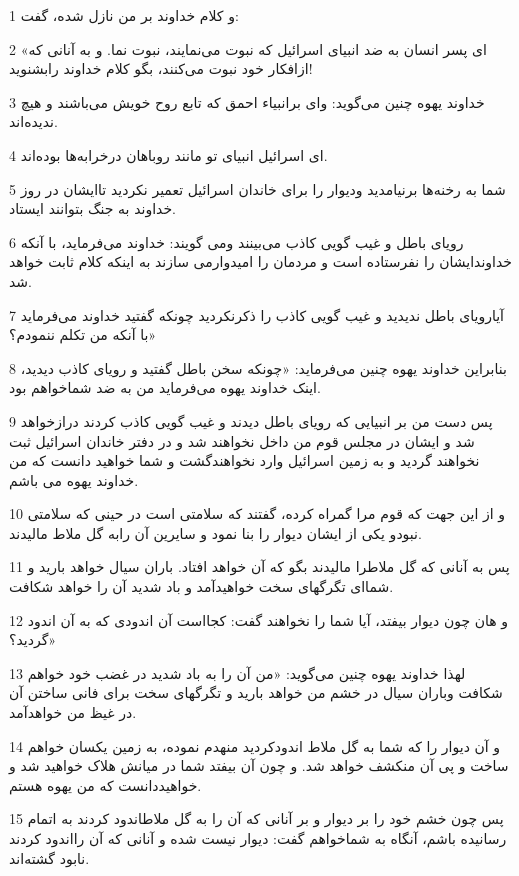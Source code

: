 \par 1 و کلام خداوند بر من نازل شده، گفت:
\par 2 «ای پسر انسان به ضد انبیای اسرائیل که نبوت می‌نمایند، نبوت نما. و به آنانی که ازافکار خود نبوت می‌کنند، بگو کلام خداوند رابشنوید!
\par 3 خداوند یهوه چنین می‌گوید: وای برانبیاء احمق که تابع روح خویش می‌باشند و هیچ ندیده‌اند.
\par 4 ‌ای اسرائیل انبیای تو مانند روباهان درخرابه‌ها بوده‌اند.
\par 5 شما به رخنه‌ها برنیامدید ودیوار را برای خاندان اسرائیل تعمیر نکردید تاایشان در روز خداوند به جنگ بتوانند ایستاد.
\par 6 رویای باطل و غیب گویی کاذب می‌بینند ومی گویند: خداوند می‌فرماید، با آنکه خداوندایشان را نفرستاده است و مردمان را امیدوارمی سازند به اینکه کلام ثابت خواهد شد.
\par 7 آیارویای باطل ندیدید و غیب گویی کاذب را ذکرنکردید چونکه گفتید خداوند می‌فرماید با آنکه من تکلم ننمودم؟»
\par 8 بنابراین خداوند یهوه چنین می‌فرماید: «چونکه سخن باطل گفتید و رویای کاذب دیدید، اینک خداوند یهوه می‌فرماید من به ضد شماخواهم بود.
\par 9 پس دست من بر انبیایی که رویای باطل دیدند و غیب گویی کاذب کردند درازخواهد شد و ایشان در مجلس قوم من داخل نخواهند شد و در دفتر خاندان اسرائیل ثبت نخواهند گردید و به زمین اسرائیل وارد نخواهندگشت و شما خواهید دانست که من خداوند یهوه می باشم.
\par 10 و از این جهت که قوم مرا گمراه کرده، گفتند که سلامتی است در حینی که سلامتی نبودو یکی از ایشان دیوار را بنا نمود و سایرین آن رابه گل ملاط مالیدند.
\par 11 پس به آنانی که گل ملاطرا مالیدند بگو که آن خواهد افتاد. باران سیال خواهد بارید و شما‌ای تگرگهای سخت خواهیدآمد و باد شدید آن را خواهد شکافت.
\par 12 و هان چون دیوار بیفتد، آیا شما را نخواهند گفت: کجااست آن اندودی که به آن اندود گردید؟»
\par 13 لهذا خداوند یهوه چنین می‌گوید: «من آن را به باد شدید در غضب خود خواهم شکافت وباران سیال در خشم من خواهد بارید و تگرگهای سخت برای فانی ساختن آن در غیظ من خواهدآمد.
\par 14 و آن دیوار را که شما به گل ملاط اندودکردید منهدم نموده، به زمین یکسان خواهم ساخت و پی آن منکشف خواهد شد. و چون آن بیفتد شما در میانش هلاک خواهید شد و خواهیددانست که من یهوه هستم.
\par 15 پس چون خشم خود را بر دیوار و بر آنانی که آن را به گل ملاطاندود کردند به اتمام رسانیده باشم، آنگاه به شماخواهم گفت: دیوار نیست شده و آنانی که آن رااندود کردند نابود گشته‌اند.
